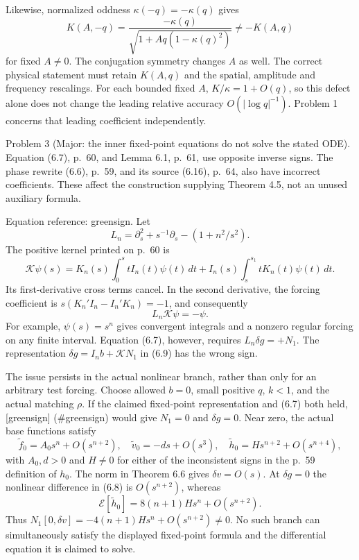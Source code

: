 \documentclass[10pt]{article}
\begin{document}
Likewise, normalized oddness \(\kappa(-q)=-\kappa(q)\) gives \[K(A,-q)=
 \frac{-\kappa(q)}{\sqrt{1+Aq(1-\kappa(q)^2)}}\ne-K(A,q)\] for fixed \(A\ne0\). The conjugation symmetry changes \(A\) as well. The correct physical statement must retain \(K(A,q)\) and the spatial, amplitude and frequency rescalings. For each bounded fixed \(A\), \(K/\kappa=1+O(q)\), so this defect alone does not change the leading relative accuracy \(O(|\log q|^{-1})\). Problem 1 concerns that leading coefficient independently.\par
Problem 3 (Major: the inner fixed-point equations do not solve the stated ODE).  Equation (6.7), p. 60, and Lemma 6.1, p. 61, use opposite inverse signs. The phase rewrite (6.6), p. 59, and its source (6.16), p. 64, also have incorrect coefficients. These affect the construction supplying Theorem 4.5, not an unused auxiliary formula.\par
Equation reference: greensign. Let \[L_n=\partial_s^2+s^{-1}\partial_s-(1+n^2/s^2).\] The positive kernel printed on p. 60 is \[\mathcal{K}\psi(s)=
 K_n(s)\int_0^s tI_n(t)\psi(t)\,dt+
 I_n(s)\int_s^{s_1}tK_n(t)\psi(t)\,dt.\] Its first-derivative cross terms cancel. In the second derivative, the forcing coefficient is \(s(K_n'I_n-I_n'K_n)=-1\), and consequently \[
 L_n\mathcal{K}\psi=-\psi.\] For example, \(\psi(s)=s^n\) gives convergent integrals and a nonzero regular forcing on any finite interval. Equation (6.7), however, requires \(L_n\delta g=+N_1\). The representation \(\delta g=I_nb+\mathcal{K}N_1\) in (6.9) has the wrong sign.\par
The issue persists in the actual nonlinear branch, rather than only for an arbitrary test forcing. Choose allowed \(b=0\), small positive \(q\), \(k<1\), and the actual matching \(\rho\). If the claimed fixed-point representation and (6.7) both held, [greensign] (\#greensign) would give \(N_1=0\) and \(\delta g=0\). Near zero, the actual base functions satisfy \[\widetilde f_0=A_0s^n+O(s^{n+2}),\quad
 \widetilde v_0=-d s+O(s^3),\quad
 \widetilde h_0=H s^{n+2}+O(s^{n+4}),\] with \(A_0,d>0\) and \(H\ne0\) for either of the inconsistent signs in the p. 59 definition of \(h_0\). The norm in Theorem 6.6 gives \(\delta v=O(s)\). At \(\delta g=0\) the nonlinear difference in (6.8) is \(O(s^{n+2})\), whereas \[\mathcal{E}[\widetilde h_0]
     =8(n+1)H s^n+O(s^{n+2}).\] Thus \(N_1[0,\delta v]=-4(n+1)Hs^n+O(s^{n+2})\ne0\). No such branch can simultaneously satisfy the displayed fixed-point formula and the differential equation it is claimed to solve.\par
\end{document}
